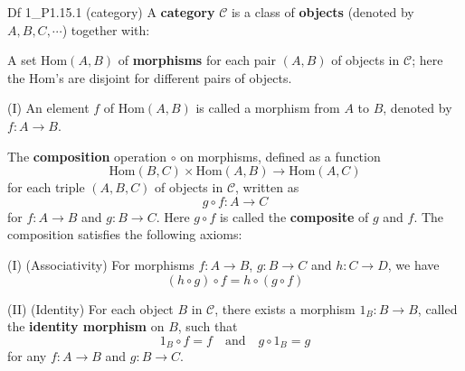 \documentclass{article}
\begin{document}
\begin{Df}{Df 1\_P1.15.1 (category)}
    A \textbf{category} $\mathscr{C}$ is a class of \textbf{objects} (denoted by $A, B, C, \cdots$) together with:
    \begin{compactenum}
        \item A set $\text{Hom}(A, B)$ of \textbf{morphisms} for each pair $(A, B)$ of objects in $\mathscr{C}$; here the $\text{Hom}$'s are disjoint for different pairs of objects.
        \begin{compactenum}
            \item[(I)] An element $f$ of $\text{Hom}(A, B)$ is called a morphism from $A$ to $B$, denoted by $f: A \to B$.
        \end{compactenum}
        \item The \textbf{composition} operation $\circ$ on morphisms, defined as a function 
        $$ \text{Hom}(B, C) \times \text{Hom}(A, B) \to \text{Hom}(A, C) $$
        for each triple $(A, B, C)$ of objects in $\mathscr{C}$, written as
        $$ g \circ f: A \to C $$
        for $f: A \to B$ and $g: B \to C$. Here $g\circ f$ is called the \textbf{composite} of $g$ and $f$. The composition satisfies the following axioms:
        \begin{compactenum}
            \item[(I)] (Associativity) For morphisms $f: A \to B$, $g: B \to C$ and $h: C \to D$, we have 
            $$ (h \circ g) \circ f = h \circ (g \circ f) $$
            \item[(II)] (Identity) For each object $B$ in $\mathscr{C}$, there exists a morphism $1_B: B \to B$, called the \textbf{identity morphism} on $B$, such that 
            $$ 1_B \circ f = f \quad \text{and} \quad g \circ 1_B = g $$
            for any $f: A \to B$ and $g: B \to C$.
        \end{compactenum}
    \end{compactenum}
\end{Df}
\end{document}
